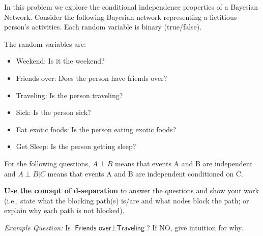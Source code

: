 \documentclass[submit]{harvardml}
\newcommand{\attr}[1]{\textsf{#1}}
\begin{document}
\begin{problem}

  \noindent In this problem we explore the conditional independence
  properties of a Bayesian Network.  Consider the following Bayesian
  network representing a fictitious person's activities. Each random
  variable is binary (true/false).

\begin{center}
\end{center}

The random variables are:

\begin{itemize}
\item \attr{Weekend}: Is it the weekend?
\item \attr{Friends over}: Does the person have friends over?
\item \attr{Traveling}: Is the person traveling?
\item \attr{Sick}: Is the person sick?
\item \attr{Eat exotic foods}: Is the person eating exotic foods?
\item \attr{Get Sleep}: Is the person getting sleep?
\end{itemize}

\medskip

For the following questions, $A \perp B$ means that events A and B are
independent and $A \perp B | C$ means that events A and B are independent
conditioned on C.

\textbf{Use the concept of d-separation} to answer the
questions and show your work (i.e., state what the blocking path(s) is/are and what nodes block the path; or explain why each path is not blocked).

\textit{Example Question:} Is $\attr{Friends over} \perp \attr{Traveling}$? If NO, give intuition for why.


\end{problem}
\end{document}
